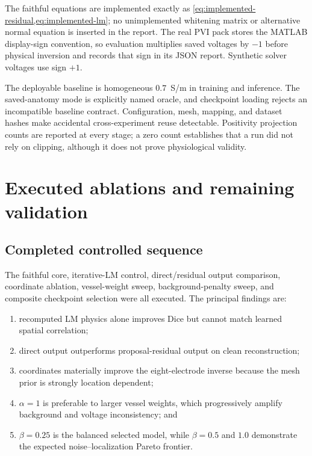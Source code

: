 \documentclass[11pt]{article}
\begin{document}
The faithful equations are implemented exactly as
\cref{eq:implemented-residual,eq:implemented-lm}; no unimplemented whitening
matrix or alternative normal equation is inserted in the report.  The real PVI
pack stores the MATLAB display-sign convention, so evaluation multiplies saved
voltages by $-1$ before physical inversion and records that sign in its JSON report.
Synthetic solver voltages use sign $+1$.

The deployable baseline is homogeneous $0.7$~S/m in training and inference.  The
saved-anatomy mode is explicitly named oracle, and checkpoint loading rejects an
incompatible baseline contract.  Configuration, mesh, mapping, and dataset hashes
make accidental cross-experiment reuse detectable.  Positivity projection counts
are reported at every stage; a zero count establishes that a run did not rely on
clipping, although it does not prove physiological validity.

\section{Executed ablations and remaining validation}

\subsection{Completed controlled sequence}

The faithful core, iterative-LM control, direct/residual output comparison,
coordinate ablation, vessel-weight sweep, background-penalty sweep, and composite
checkpoint selection were all executed.  The principal findings are:
\begin{enumerate}
\item recomputed LM physics alone improves Dice but cannot match learned spatial
correlation;
\item direct output outperforms proposal-residual output on clean reconstruction;
\item coordinates materially improve the eight-electrode inverse because the mesh
prior is strongly location dependent;
\item $\alpha=1$ is preferable to larger vessel weights, which progressively amplify
background and voltage inconsistency; and
\item $\beta=0.25$ is the balanced selected model, while $\beta=0.5$ and $1.0$
demonstrate the expected noise--localization Pareto frontier.
\end{enumerate}
\end{document}
